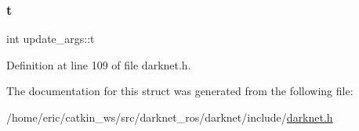 \subsubsection{\texorpdfstring{t}{t}}
{\footnotesize\ttfamily int update\+\_\+args\+::t}



Definition at line 109 of file darknet.\+h.



The documentation for this struct was generated from the following file\+:\begin{DoxyCompactItemize}
\item 
/home/eric/catkin\+\_\+ws/src/darknet\+\_\+ros/darknet/include/\mbox{\hyperlink{darknet_8h}{darknet.\+h}}\end{DoxyCompactItemize}
